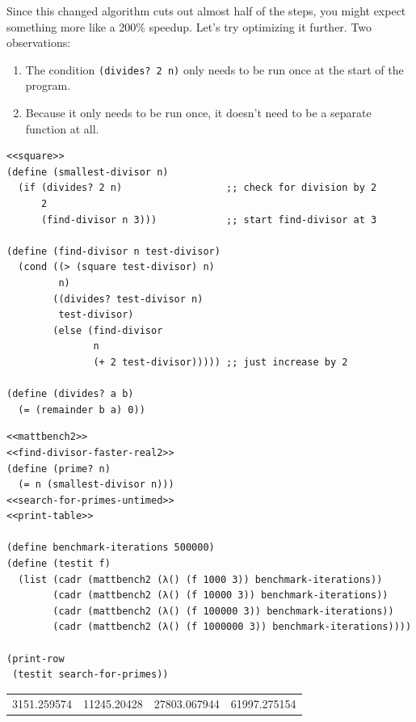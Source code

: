 \documentclass[final,fleqn,titlepage]{article}
\begin{document}
Since this changed algorithm cuts out almost half of the steps, you might expect
something more like a 200\% speedup. Let's try optimizing it further. Two observations:

\begin{enumerate}
\item The condition \texttt{(divides? 2 n)} only needs to be run once at the
start of the program.
\item Because it only needs to be run once, it doesn't need to be a separate
function at all.
\end{enumerate}

\begin{verbatim}
<<square>>
(define (smallest-divisor n)
  (if (divides? 2 n)                  ;; check for division by 2
      2
      (find-divisor n 3)))            ;; start find-divisor at 3

(define (find-divisor n test-divisor)
  (cond ((> (square test-divisor) n) 
         n)
        ((divides? test-divisor n) 
         test-divisor)
        (else (find-divisor 
               n 
               (+ 2 test-divisor))))) ;; just increase by 2

(define (divides? a b)
  (= (remainder b a) 0))
\end{verbatim}
\begin{verbatim}
<<mattbench2>>
<<find-divisor-faster-real2>>
(define (prime? n)
  (= n (smallest-divisor n)))
<<search-for-primes-untimed>>
<<print-table>>

(define benchmark-iterations 500000)
(define (testit f)
  (list (cadr (mattbench2 (λ() (f 1000 3)) benchmark-iterations))
        (cadr (mattbench2 (λ() (f 10000 3)) benchmark-iterations))
        (cadr (mattbench2 (λ() (f 100000 3)) benchmark-iterations))
        (cadr (mattbench2 (λ() (f 1000000 3)) benchmark-iterations))))

(print-row
 (testit search-for-primes))
\end{verbatim}


\begin{table}[htbp]
\label{1-22-smdff2}
\centering
\begin{tabular}{rrrr}
3151.259574 & 11245.20428 & 27803.067944 & 61997.275154\\
\end{tabular}
\end{table}
\end{document}
